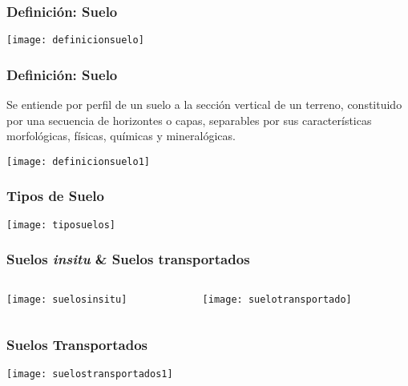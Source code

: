 \documentclass{beamer}
\begin{document}
\begin{frame}
\frametitle{Definición: Suelo}
\begin{center}
   	\texttt{[image: definicionsuelo]}
\end{center}
\end{frame}
\begin{frame}
\frametitle{Definición: Suelo}
\small{Se entiende por perfil de un suelo a la sección vertical de un terreno, constituido por una secuencia de horizontes o capas, separables por sus características morfológicas, físicas, químicas y mineralógicas.}
\begin{center}
   	\texttt{[image: definicionsuelo1]}
\end{center}
\end{frame}
\begin{frame}
\frametitle{Tipos de Suelo}
\begin{center}
   	\texttt{[image: tiposuelos]}
\end{center}
\end{frame}
\begin{frame}
\frametitle{Suelos \emph{insitu} \& Suelos transportados}
\begin{columns}
\begin{column}{.5\linewidth}
\begin{center}
\texttt{[image: suelosinsitu]}
\end{center}
\end{column}
\begin{column}{.5\linewidth}
\begin{center}
\texttt{[image: suelotransportado]}
\end{center}
\end{column}
\end{columns}
\end{frame}
\begin{frame}
\frametitle{Suelos Transportados}
\begin{center}
   	\texttt{[image: suelostransportados1]}
\end{center}
\end{frame}
\end{document}
